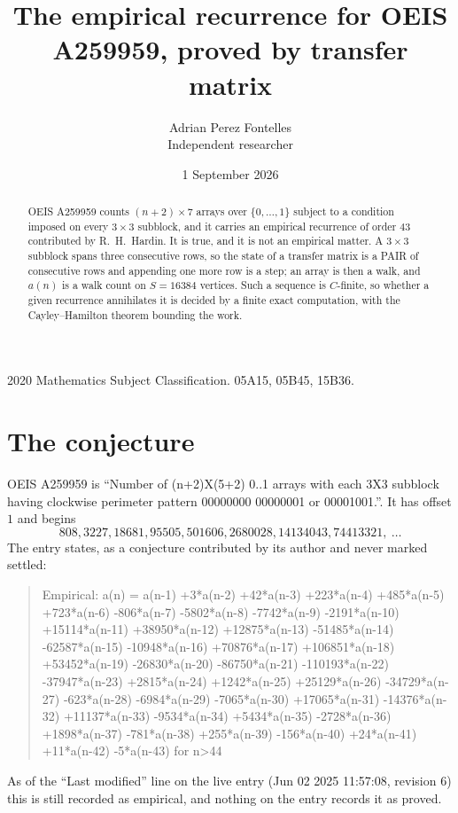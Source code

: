 \documentclass[11pt,a4paper]{article}
\title{The empirical recurrence for OEIS A259959, proved by transfer matrix}
\author{Adrian Perez Fontelles\\ \small Independent researcher}
\date{1 September 2026}
\theoremstyle{plain}
\theoremstyle{definition}
\begin{document}
\maketitle

\begin{abstract}
OEIS A259959 counts $(n+2)\times7$ arrays over $\{0,\dots,1\}$ subject to a condition imposed on
every $3\times3$ subblock, and it carries an empirical recurrence of order $43$
contributed by R.~H.~Hardin. It is true, and it is not an empirical matter. A $3\times3$
subblock spans three consecutive rows, so the state of a transfer matrix is a PAIR of
consecutive rows and appending one more row is a step; an array is then a walk, and
$a(n)$ is a walk count on $S=16384$ vertices. Such a sequence is $C$-finite, so whether a given
recurrence annihilates it is decided by a finite exact computation, with the Cayley--Hamilton
theorem bounding the work.
\end{abstract}

\noindent\small 2020 Mathematics Subject Classification. 05A15, 05B45, 15B36.\normalsize

\section{The conjecture}

OEIS A259959 is ``Number of (n+2)X(5+2) 0..1 arrays with each 3X3 subblock having clockwise perimeter pattern 00000000 00000001 or 00001001.''. It has offset $1$ and begins
\[
808, 3227, 18681, 95505, 501606, 2680028, 14134043, 74413321,\ \dots
\]
The entry states, as a conjecture contributed by its author and never marked settled:
\begin{quote}
Empirical: a(n) = a(n-1) +3*a(n-2) +42*a(n-3) +223*a(n-4) +485*a(n-5) +723*a(n-6) -806*a(n-7) -5802*a(n-8) -7742*a(n-9) -2191*a(n-10) +15114*a(n-11) +38950*a(n-12) +12875*a(n-13) -51485*a(n-14) -62587*a(n-15) -10948*a(n-16) +70876*a(n-17) +106851*a(n-18) +53452*a(n-19) -26830*a(n-20) -86750*a(n-21) -110193*a(n-22) -37947*a(n-23) +2815*a(n-24) +1242*a(n-25) +25129*a(n-26) -34729*a(n-27) -623*a(n-28) -6984*a(n-29) -7065*a(n-30) +17065*a(n-31) -14376*a(n-32) +11137*a(n-33) -9534*a(n-34) +5434*a(n-35) -2728*a(n-36) +1898*a(n-37) -781*a(n-38) +255*a(n-39) -156*a(n-40) +24*a(n-41) +11*a(n-42) -5*a(n-43) for n>44
\end{quote}
As of the ``Last modified'' line on the live entry (Jun 02 2025 11:57:08, revision 6) this is still
recorded as empirical, and nothing on the entry records it as proved.
\end{document}
